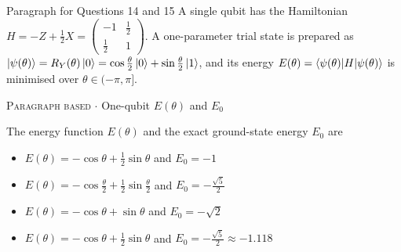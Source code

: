 \documentclass[11pt,a4paper]{article}
\newcommand{\optlabel}[1]{\textbf{(#1)}}
\newcommand{\correctlabel}[1]{\textcolor{okgreen}{\textbf{(#1)}\,\ding{51}}}
\newenvironment{qitem}[1]{\begin{list}{}{\setlength{\leftmargin}{3.3em}\setlength{\labelwidth}{3.1em}%
  \setlength{\labelsep}{0.2em}\setlength{\topsep}{3pt}\setlength{\parsep}{3pt}}\item[\textbf{Q.#1}\hfill]}{\end{list}}
\newcommand{\qsep}{\par\vspace{2pt}{\color{black!15}\hrule}\vspace{4pt}}
\newcommand{\qmeta}[2]{{\footnotesize\color{black!60}\textsc{#1} \;$\cdot$\; #2}\par}
\begin{document}
\qsep

\begin{passagebox}{Paragraph for Questions 14 and 15}
A single qubit has the Hamiltonian $H = -Z + \tfrac12 X = \begin{pmatrix}-1 & \tfrac12\\ \tfrac12 & 1\end{pmatrix}$.
A one-parameter trial state is prepared as $\ket{\psi(\theta)} = R_Y(\theta)\ket0 = \cos\tfrac\theta2\ket0 + \sin\tfrac\theta2\ket1$, and its
energy $E(\theta) = \braket{\psi(\theta)|H|\psi(\theta)}$ is minimised over $\theta \in (-\pi, \pi]$.
\end{passagebox}
\begin{qitem}{14}
\qmeta{Paragraph based}{One-qubit $E(\theta)$ and $E_0$}
The energy function $E(\theta)$ and the exact ground-state energy $E_0$ are
\begin{itemize}[leftmargin=2.6em, labelsep=0.4em, itemsep=2pt, topsep=3pt]
\item[\optlabel{A}] $E(\theta) = -\cos\theta + \tfrac12\sin\theta$ and $E_0 = -1$
\item[\optlabel{B}] $E(\theta) = -\cos\tfrac\theta2 + \tfrac12\sin\tfrac\theta2$ and $E_0 = -\tfrac{\sqrt5}{2}$
\item[\optlabel{C}] $E(\theta) = -\cos\theta + \sin\theta$ and $E_0 = -\sqrt2$
\item[\correctlabel{D}] $E(\theta) = -\cos\theta + \tfrac12\sin\theta$ and $E_0 = -\tfrac{\sqrt5}{2} \approx -1.118$
\end{itemize}
\end{qitem}
\end{document}
